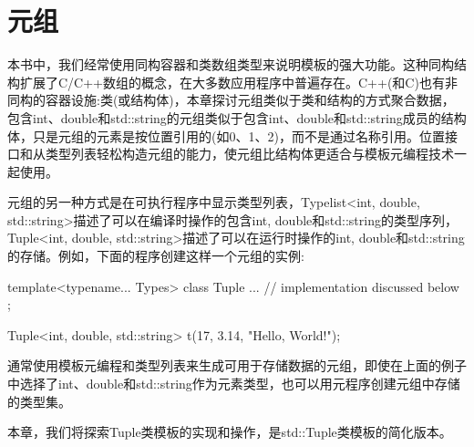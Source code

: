 \chapter{元组}
本书中，我们经常使用同构容器和类数组类型来说明模板的强大功能。这种同构结构扩展了C/C++数组的概念，在大多数应用程序中普遍存在。C++(和C)也有非同构的容器设施:类(或结构体)，本章探讨元组类似于类和结构的方式聚合数据，包含int、double和std::string的元组类似于包含int、double和std::string成员的结构体，只是元组的元素是按位置引用的(如0、1、2)，而不是通过名称引用。位置接口和从类型列表轻松构造元组的能力，使元组比结构体更适合与模板元编程技术一起使用。

元组的另一种方式是在可执行程序中显示类型列表，Typelist<int, double, std::string>描述了可以在编译时操作的包含int, double和std::string的类型序列，Tuple<int, double, std::string>描述了可以在运行时操作的int, double和std::string的存储。例如，下面的程序创建这样一个元组的实例:

\begin{cpp}
template<typename... Types>
class Tuple {
	... // implementation discussed below
};

Tuple<int, double, std::string> t(17, 3.14, "Hello, World!");
\end{cpp}

通常使用模板元编程和类型列表来生成可用于存储数据的元组，即使在上面的例子中选择了int、double和std::string作为元素类型，也可以用元程序创建元组中存储的类型集。

本章，我们将探索Tuple类模板的实现和操作，是std::Tuple类模板的简化版本。





































